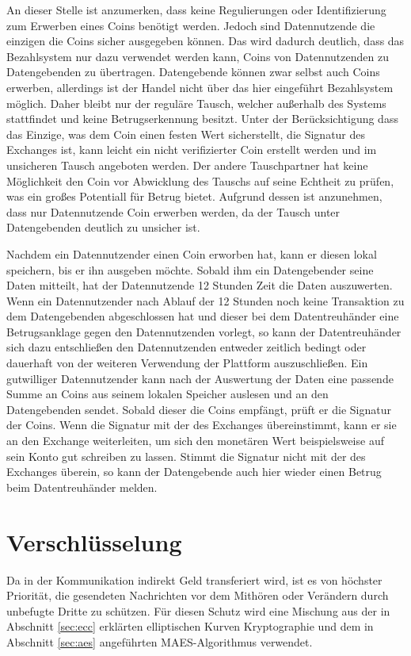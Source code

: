 \documentclass{scrreprt}
\begin{document}
An dieser Stelle ist anzumerken, dass keine Regulierungen oder Identifizierung zum Erwerben eines Coins benötigt werden. Jedoch sind Datennutzende die einzigen die Coins sicher ausgegeben können. Das wird dadurch deutlich, dass das Bezahlsystem nur dazu verwendet werden kann, Coins von Datennutzenden zu Datengebenden zu übertragen. Datengebende können zwar selbst auch Coins erwerben, allerdings ist der Handel nicht über das hier eingeführt Bezahlsystem möglich. Daher bleibt nur der reguläre Tausch, welcher außerhalb des Systems stattfindet und keine Betrugserkennung besitzt. Unter der Berücksichtigung dass das Einzige, was dem Coin einen festen Wert sicherstellt, die Signatur des Exchanges ist, kann leicht ein nicht verifizierter Coin erstellt werden und im unsicheren Tausch angeboten werden. Der andere Tauschpartner hat keine Möglichkeit den Coin vor Abwicklung des Tauschs auf seine Echtheit zu prüfen, was ein großes Potentiall für Betrug bietet. Aufgrund dessen ist anzunehmen, dass nur Datennutzende Coin erwerben werden, da der Tausch unter Datengebenden deutlich zu unsicher ist.

Nachdem ein Datennutzender einen Coin erworben hat, kann er diesen lokal speichern, bis er ihn ausgeben möchte. Sobald ihm ein Datengebender seine Daten mitteilt, hat der Datennutzende 12 Stunden Zeit die Daten auszuwerten. Wenn ein Datennutzender nach Ablauf der 12 Stunden noch keine Transaktion zu dem Datengebenden abgeschlossen hat und dieser bei dem Datentreuhänder eine Betrugsanklage gegen den Datennutzenden vorlegt, so kann der Datentreuhänder sich dazu entschließen den Datennutzenden entweder zeitlich bedingt oder dauerhaft von der weiteren Verwendung der Plattform auszuschließen. Ein gutwilliger Datennutzender kann nach der Auswertung der Daten eine passende Summe an Coins aus seinem lokalen Speicher auslesen und an den Datengebenden sendet. Sobald dieser die Coins empfängt, prüft er die Signatur der Coins. Wenn die Signatur mit der des Exchanges übereinstimmt, kann er sie an den Exchange weiterleiten, um sich den monetären Wert beispielsweise auf sein Konto gut schreiben zu lassen. Stimmt die Signatur nicht mit der des Exchanges überein, so kann der Datengebende auch hier wieder einen Betrug beim Datentreuhänder melden.

\section{Verschlüsselung}
Da in der Kommunikation indirekt Geld transferiert wird, ist es von höchster Priorität, die gesendeten Nachrichten vor dem Mithören oder Verändern durch unbefugte Dritte zu schützen. Für diesen Schutz wird eine Mischung aus der in Abschnitt \ref{sec:ecc} erklärten elliptischen Kurven Kryptographie und dem in Abschnitt \ref{sec:aes} angeführten MAES-Algorithmus verwendet. 
\end{document}
